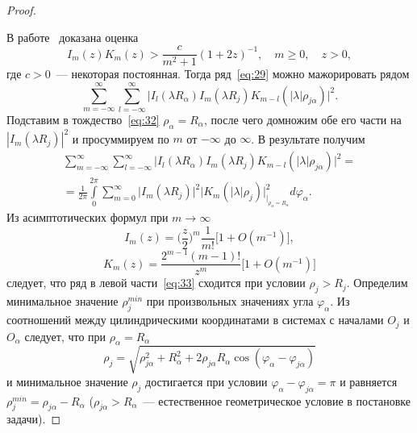 \begin{proof}
\begin{equation}
\label{eq:31}
\end{equation}
\par В работе~\cite{Nikolaev1998} доказана оценка
\begin{equation}
I_m(z)K_m(z)>\frac{c}{m^2+1}(1+2z)^{-1},\quad m\ge 0,\quad z>0,
\label{eq:37}
\end{equation}
где $c>0$~--- некоторая постоянная. Тогда ряд~\eqref{eq:29} можно мажорировать рядом
\begin{equation*}
\sum\limits_{m=-\infty}^\infty\sum\limits_{l=-\infty}^\infty\bigg|I_l(\lambda R_\alpha)I_m(\lambda R_j)K_{m-l}(|\lambda|\rho_{j\alpha})\bigg|^2.
\end{equation*}
Подставим в тождество~\eqref{eq:32} $\rho_\alpha=R_\alpha$, после чего домножим обе его части на $|I_m(\lambda R_j)|^2$ и просуммируем по $m$ от $-\infty$ до $\infty$. В результате получим
\begin{multline}
\sum\limits_{m=-\infty}^\infty\sum\limits_{l=-\infty}^\infty\bigg|I_l(\lambda R_\alpha)I_m(\lambda R_j)K_{m-l}(|\lambda|\rho_{j\alpha})\bigg|^2=\\
=\frac{1}{2\pi}\int\limits_0^{2\pi}\sum\limits_{m=0}^\infty\bigg|I_m(\lambda R_j)\bigg|^2\bigg|K_m(|\lambda|\rho_j)\bigg|_{|_{\rho_\alpha=R_\alpha}}^2d\varphi_\alpha.
\label{eq:33}
\end{multline}
Из асимптотических формул при $m\rightarrow\infty$~\cite{Lebedev}
\begin{equation}
I_m(z)=\bigg(\frac{z}{2}\bigg)^m\frac{1}{m!}\bigg[1+O(m^{-1})\bigg],
\label{eq:35}
\end{equation}
\begin{equation}
K_m(z)=\frac{2^{m-1}(m-1)!}{z^m}\bigg[1+O(m^{-1})\bigg]
\label{eq:36}
\end{equation}
следует, что ряд в левой части~\eqref{eq:33} сходится при условии $\rho_j>R_j$. Определим минимальное значение $\rho_j^{min}$ при произвольных значениях угла $\varphi_\alpha$. Из соотношений между цилиндрическими координатами в системах с началами $O_j$ и $O_\alpha$ следует, что при $\rho_\alpha=R_\alpha$
\begin{equation*}
\rho_j=\sqrt{\rho_{j\alpha}^2+R_\alpha^2+2\rho_{j\alpha}R_\alpha\cos{(\varphi_\alpha-\varphi_{j\alpha})}}
\end{equation*}
и минимальное значение $\rho_j$ достигается при условии $\varphi_\alpha-\varphi_{j\alpha}=\pi$ и равняется $\rho_j^{min}=\rho_{j\alpha}-R_\alpha$ ($\rho_{j\alpha}>R_\alpha$~--- естественное геометрическое условие в постановке задачи).


\end{proof}
